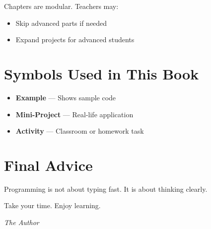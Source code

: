 Chapters are modular.
Teachers may:
\begin{itemize}
    \item Skip advanced parts if needed
    \item Expand projects for advanced students
\end{itemize}

\section*{Symbols Used in This Book}

\begin{itemize}
    \item \textbf{Example} — Shows sample code
    \item \textbf{Mini-Project} — Real-life application
    \item \textbf{Activity} — Classroom or homework task
\end{itemize}

\section*{Final Advice}

Programming is not about typing fast.
It is about thinking clearly.

Take your time.
Enjoy learning.

\vfill
\begin{flushright}
\textit{The Author}
\end{flushright}
